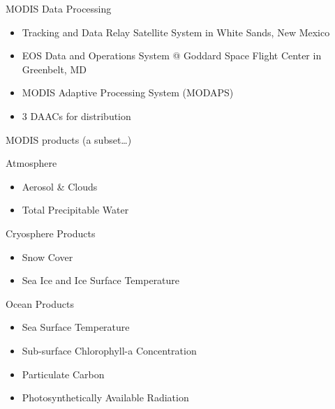 \documentclass[ignorenonframetext,]{beamer}
\begin{document}
\begin{frame}{MODIS Data Processing}

\begin{itemize}
\itemsep1pt\parskip0pt
\item
  Tracking and Data Relay Satellite System in White Sands, New Mexico
\item
  EOS Data and Operations System @ Goddard Space Flight Center in
  Greenbelt, MD
\item
  MODIS Adaptive Processing System (MODAPS)
\item
  3 DAACs for distribution
\end{itemize}

\end{frame}

\begin{frame}{MODIS products (a subset\ldots{})}

\begin{block}{Atmosphere}

\begin{itemize}
\itemsep1pt\parskip0pt
\item
  Aerosol \& Clouds
\item
  Total Precipitable Water
\end{itemize}

\end{block}

\begin{block}{Cryosphere Products}

\begin{itemize}
\itemsep1pt\parskip0pt
\item
  Snow Cover
\item
  Sea Ice and Ice Surface Temperature
\end{itemize}

\end{block}

\begin{block}{Ocean Products}

\begin{itemize}
\itemsep1pt\parskip0pt
\item
  Sea Surface Temperature
\item
  Sub-surface Chlorophyll-a Concentration
\item
  Particulate Carbon
\item
  Photosynthetically Available Radiation
\end{itemize}

\end{block}

\end{frame}
\end{document}
